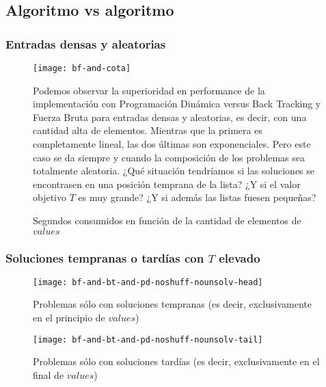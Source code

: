 \subsection{Algoritmo vs algoritmo}
\subsubsection{Entradas densas y aleatorias}
\begin{figure}[H]
	\centering
	\begin{minipage}{0.48\textwidth}
		\centering
		\texttt{[image: bf-and-cota]}
		\caption{\footnotesize Segundos consumidos en función de la cantidad de elementos de $values$}
		\label{fig:bf-and-bt-and-pd}
	\end{minipage}%
	\hspace{0.03\textwidth}
	\begin{minipage}{0.48\textwidth}
		Podemos observar la superioridad en performance de la implementación con Programación Dinámica versus Back Tracking y Fuerza Bruta para entradas densas y aleatorias, es decir, con una cantidad alta de elementos. Mientras que la primera es completamente lineal, las dos últimas son exponenciales. Pero este caso se da siempre y cuando la composición de los problemas sea totalmente aleatoria. ¿Qué situación tendríamos si las soluciones se encontrasen en una posición temprana de la lista? ¿Y si el valor objetivo $T$ es muy grande? ¿Y si además las listas fuesen pequeñas?
	\end{minipage}%
\end{figure}

\subsubsection{Soluciones tempranas o tardías con $T$ elevado}
\begin{figure}[H]
	\centering
	\begin{minipage}{0.48\textwidth}
		\centering
		\texttt{[image: bf-and-bt-and-pd-noshuff-nounsolv-head]}
		\caption{\footnotesize Problemas sólo con soluciones tempranas (es decir, exclusivamente en el principio de $values$)}
		\label{fig:bf-and-bt-and-pd-noshuff-nounsolv-head}
	\end{minipage}%
	\hspace{0.03\textwidth}
	\begin{minipage}{0.48\textwidth}
		\centering
		\texttt{[image: bf-and-bt-and-pd-noshuff-nounsolv-tail]}
		\caption{\footnotesize Problemas sólo con soluciones tardías (es decir, exclusivamente en el final de $values$)}
		\label{fig:bf-and-bt-and-pd-noshuff-nounsolv-tail}
	\end{minipage}%
\end{figure}

